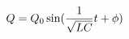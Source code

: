 \documentclass[preview]{standalone}
\begin{document}
\begin{align*}
Q = Q_0 \sin( {1 \over \sqrt{ L C}} t + \phi )
\end{align*}
\end{document}
